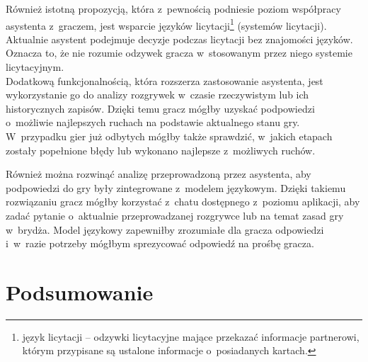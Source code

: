 Również istotną propozycją, która z~pewnością podniesie poziom
współpracy asystenta z~graczem, jest wsparcie języków licytacji\footnote{
    język licytacji -- odzywki licytacyjne mające przekazać informacje
    partnerowi, którym przypisane
    są ustalone informacje o~posiadanych kartach.
} (systemów licytacji).
Aktualnie asystent podejmuje decyzje podczas licytacji bez znajomości
języków. Oznacza to, że nie rozumie odzywek gracza w~stosowanym przez
niego systemie licytacyjnym. \\

Dodatkową funkcjonalnością, która rozszerza zastosowanie asystenta, jest
wykorzystanie go do analizy rozgrywek w~czasie rzeczywistym lub
ich historycznych zapisów. Dzięki temu gracz mógłby uzyskać podpowiedzi
o~możliwie najlepszych ruchach na podstawie aktualnego stanu gry.
W~przypadku gier już odbytych mógłby także sprawdzić, w~jakich etapach
zostały popełnione błędy lub wykonano najlepsze z~możliwych ruchów.

Również można rozwinąć analizę przeprowadzoną przez asystenta, aby
podpowiedzi do gry były zintegrowane z~modelem językowym. Dzięki
takiemu rozwiązaniu gracz mógłby korzystać z~chatu dostępnego
z~poziomu aplikacji, aby zadać pytanie o~aktualnie przeprowadzanej
rozgrywce lub na temat zasad gry w~brydża. Model językowy zapewniłby
zrozumiałe dla gracza odpowiedzi i~w~razie potrzeby mógłbym sprezycować
odpowiedź na prośbę gracza.

\section{Podsumowanie}


